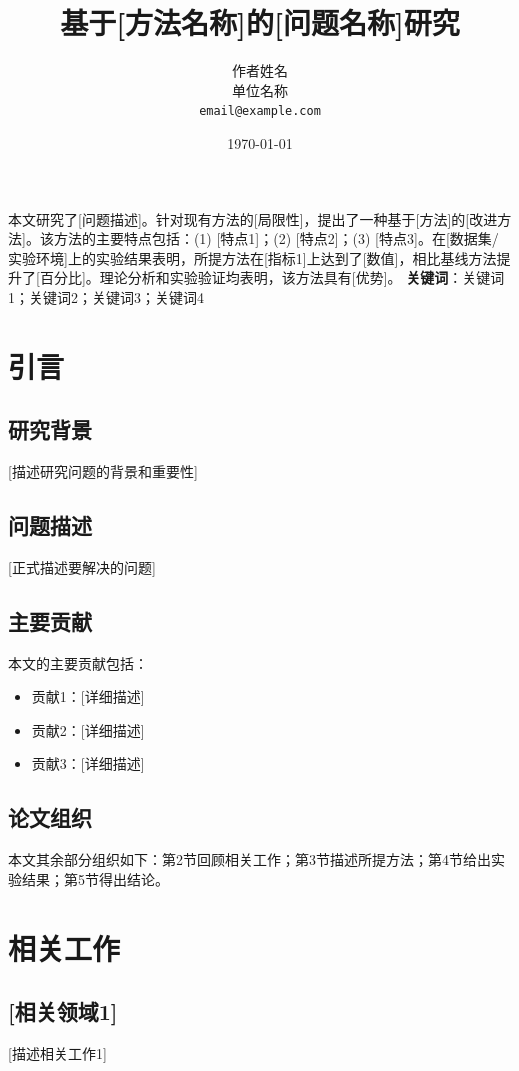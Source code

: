 \documentclass[12pt,a4paper]{article}
\title{基于[方法名称]的[问题名称]研究}
\author{作者姓名\\[0.5em]
\small 单位名称\\
\small \texttt{email@example.com}}
\date{\today}
\renewenvironment{abstract}{%
  \small
  \begin{center}%
    {\bfseries\abstractname\vspace{-.5em}}%
  \end{center}%
  \par\noindent\ignorespaces
}{%
  \par
}
\begin{document}
\maketitle

\begin{abstract}
本文研究了[问题描述]。针对现有方法的[局限性]，提出了一种基于[方法]的[改进方法]。该方法的主要特点包括：(1) [特点1]；(2) [特点2]；(3) [特点3]。在[数据集/实验环境]上的实验结果表明，所提方法在[指标1]上达到了[数值]，相比基线方法提升了[百分比]。理论分析和实验验证均表明，该方法具有[优势]。
\textbf{关键词}：关键词1；关键词2；关键词3；关键词4
\end{abstract}

\section{引言}

\subsection{研究背景}
[描述研究问题的背景和重要性]

\subsection{问题描述}
[正式描述要解决的问题]

\subsection{主要贡献}
本文的主要贡献包括：
\begin{itemize}
    \item 贡献1：[详细描述]
    \item 贡献2：[详细描述]
    \item 贡献3：[详细描述]
\end{itemize}

\subsection{论文组织}
本文其余部分组织如下：第2节回顾相关工作；第3节描述所提方法；第4节给出实验结果；第5节得出结论。

\section{相关工作}

\subsection{[相关领域1]}
[描述相关工作1]
\end{document}
